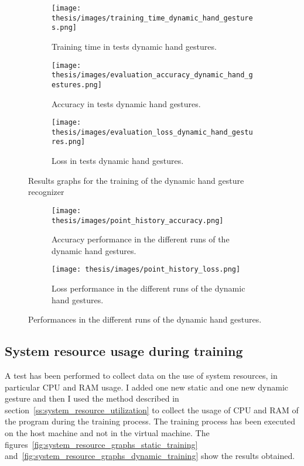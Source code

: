 \documentclass[../thesis.tex]{subfiles}
\begin{document}
\begin{figure}[H]
     \centering
     \begin{subfigure}[b]{0.45\textwidth}
         \centering
         \texttt{[image: thesis/images/training\_time\_dynamic\_hand\_gestures.png]}
         \caption{Training time in tests dynamic hand gestures.}
         \label{fig:training_time_dynamic_hand_gestures}
     \end{subfigure}
     \hfill
     \begin{subfigure}[b]{0.45\textwidth}
         \centering
         \texttt{[image: thesis/images/evaluation\_accuracy\_dynamic\_hand\_gestures.png]}
         \caption{Accuracy in tests dynamic hand gestures.}
         \label{fig:evaluation_accuracy_dynamic_hand_gestures}
     \end{subfigure}
     \hfill
     \begin{subfigure}[b]{0.45\textwidth}
         \centering
         \texttt{[image: thesis/images/evaluation\_loss\_dynamic\_hand\_gestures.png]}
         \caption{Loss in tests dynamic hand gestures.}
         \label{fig:evaluation_loss_dynamic_hand_gestures.}
     \end{subfigure}
        \caption{Results graphs for the training of the dynamic hand gesture recognizer}
        \label{fig:results_graphs_dynamic_hand_gestures}
\end{figure}

\begin{figure}[H]
\centering
\begin{subfigure}[b]{\textwidth}
    \centering
    \texttt{[image: thesis/images/point\_history\_accuracy.png]}
    \caption{Accuracy performance in the different runs of the dynamic hand gestures.}
    \label{fig:accuracy_performance_dynamic_hand_gestures}
\end{subfigure}
\hfill
\begin{subfigure}[b]{\textwidth}
    \centering
    \texttt{[image: thesis/images/point\_history\_loss.png]}
    \caption{Loss performance in the different runs of the dynamic hand gestures.}
    \label{fig:loss_performance_dynamic_hand_gestures}
\end{subfigure}
\caption{Performances in the different runs of the dynamic hand gestures.}
\label{fig:performances_dynamic_hand_gestures}
\end{figure}

\subsection{System resource usage during training}\label{ss:system_resource_usage_training}
A test has been performed to collect data on the use of system resources, in particular CPU and RAM usage. I added one new static and one new dynamic gesture and then I used the method described in section~\ref{ss:system_resource_utilization} to collect the usage of CPU and RAM of the program during the training process. The training process has been executed on the host machine and not in the virtual machine. The figures~\ref{fig:system_resource_graphs_static_training} and~\ref{fig:system_resource_graphs_dynamic_training} show the results obtained.
\end{document}
